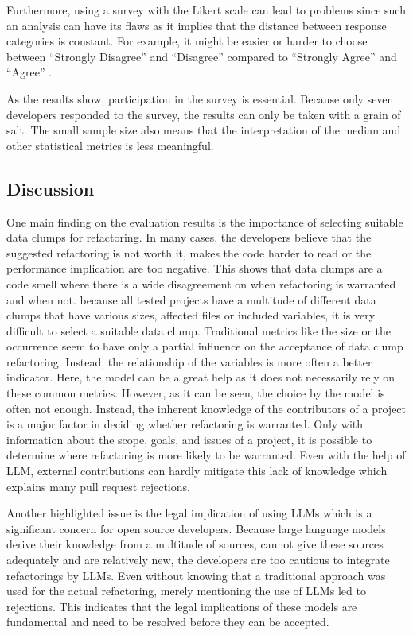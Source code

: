 Furthermore, using a survey with the Likert scale can lead to problems since such an analysis can have its flaws as it implies that the distance between response categories is constant. For example, it might be easier or harder to choose between \enquote{Strongly Disagree} and \enquote{Disagree} compared to \enquote{Strongly Agree} and \enquote{Agree} \cite{HARPE2015836}.

As the results show, participation in the survey is essential. Because only seven developers responded to the survey, the results can only be taken with a grain of salt. The small sample size also means that the interpretation of the median and other statistical metrics is less meaningful.

\subsection{Discussion}

One main finding on the evaluation results is the importance of selecting suitable data clumps for refactoring. In many cases, the developers believe that the suggested refactoring is not worth it, makes the code harder to read or the performance implication are too negative. This shows that data clumps are a code smell where there is a wide disagreement on when refactoring is warranted and when not. because all tested projects have a multitude of different data clumps that have various sizes, affected files or included variables, it is very difficult to select a suitable data clump. Traditional metrics like the size or the occurrence seem to have only a partial influence on the acceptance of data clump refactoring. Instead, the relationship of the variables is more often a better indicator. Here, the model can be a great help as it does not necessarily rely on these common metrics. However, as it can be seen, the choice by the model is often not enough. Instead, the inherent knowledge of the contributors of a project is a major factor in  deciding whether refactoring is warranted. Only with information about the scope, goals, and issues of a project, it is possible to determine where refactoring is more likely to be warranted. Even with the help of \ac{LLM}, external contributions can hardly mitigate this lack of knowledge which explains many pull request rejections. 

Another highlighted issue is the legal implication of using \acp{LLM} which is a significant concern for open source developers. Because large language models derive their knowledge from a multitude of sources, cannot give these sources adequately and are relatively new, the developers are too cautious to integrate refactorings by \acp{LLM}. Even without knowing that a traditional approach was used for the actual refactoring, merely mentioning the use of LLMs led to rejections.  This indicates that the legal implications of these models are fundamental and need to be resolved before they can be accepted. 


